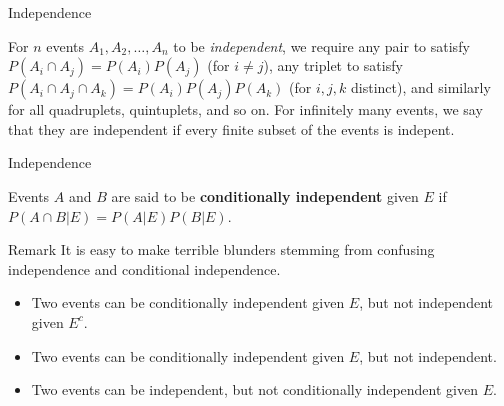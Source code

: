 \documentclass{beamer}
\newcommand{\tb}[1]{\textbf{#1}}
\newcommand{\ti}[1]{\textit{#1}}
\begin{document}
\begin{frame}{Independence}
    \begin{definition}
        For $n$ events $A_1,A_2,\dots,A_n$ to be \ti{independent}, we require any pair to satisfy $P(A_i\cap A_j) = P(A_i)P(A_j)$ (for $i \neq j$), any triplet to satisfy $P(A_i \cap A_j \cap A_k) = P(A_i)P(A_j)P(A_k)$ (for $i,j,k$ distinct), and similarly for all quadruplets, quintuplets, and so on.\newline
        \newline
        For infinitely many events, we say that they are independent if every finite subset of the events is indepent.
    \end{definition}
\end{frame}

\begin{frame}{Independence}
    \begin{definition}
        Events $A$ and $B$ are said to be \tb{conditionally independent} given $E$ if $P(A \cap B|E) = P(A|E)P(B|E)$.
    \end{definition}
    \begin{block}{Remark}
            It is easy to make terrible blunders stemming from confusing independence and conditional independence. 
            \begin{itemize}
                \item Two events can be conditionally independent given $E$, but not independent given $E^c$. 
                \item Two events can be conditionally independent given $E$, but not independent.
                \item Two events can be independent, but not conditionally independent given $E$.
            \end{itemize}
    \end{block}

\end{frame}
\end{document}
